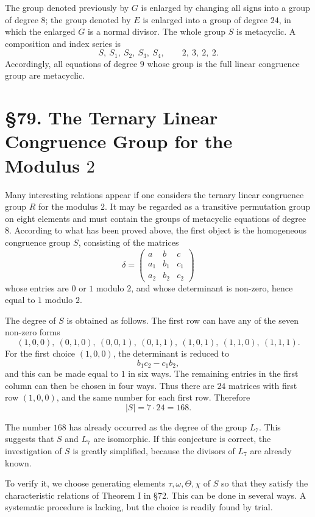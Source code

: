 \documentclass[11pt,a4paper]{book}
\newcommand{\webersection}[2]{\clearpage\section*{\S #1. #2}}
\begin{document}
The group denoted previously by \(G\) is enlarged by changing all signs into a group of degree \(8\); the group denoted by \(E\) is enlarged into a group of degree \(24\), in which the enlarged \(G\) is a normal divisor.  The whole group \(S\) is metacyclic.  A composition and index series is
\[
 S,\ S_1,\ S_2,\ S_3,\ S_4,
 \qquad
 2,\ 3,\ 2,\ 2.
\]
Accordingly, all equations of degree \(9\) whose group is the full linear congruence group are metacyclic.

\webersection{79}{The Ternary Linear Congruence Group for the Modulus \(2\)}

Many interesting relations appear if one considers the ternary linear congruence group \(R\) for the modulus \(2\).  It may be regarded as a transitive permutation group on eight elements and must contain the groups of metacyclic equations of degree \(8\).  According to what has been proved above, the first object is the homogeneous congruence group \(S\), consisting of the matrices
\[
 \delta=
 \begin{pmatrix}
 a&b&c\\
 a_1&b_1&c_1\\
 a_2&b_2&c_2
 \end{pmatrix}
\]
whose entries are \(0\) or \(1\) modulo \(2\), and whose determinant is non-zero, hence equal to \(1\) modulo \(2\).

The degree of \(S\) is obtained as follows.  The first row can have any of the seven non-zero forms
\[
 (1,0,0),\ (0,1,0),\ (0,0,1),\ (0,1,1),\ (1,0,1),\ (1,1,0),\ (1,1,1).
\]
For the first choice \((1,0,0)\), the determinant is reduced to
\[
 b_1c_2-c_1b_2,
\]
and this can be made equal to \(1\) in six ways.  The remaining entries in the first column can then be chosen in four ways.  Thus there are \(24\) matrices with first row \((1,0,0)\), and the same number for each first row.  Therefore
\[
 |S|=7\cdot24=168.
\]

The number \(168\) has already occurred as the degree of the group \(L_7\).  This suggests that \(S\) and \(L_7\) are isomorphic.  If this conjecture is correct, the investigation of \(S\) is greatly simplified, because the divisors of \(L_7\) are already known.

To verify it, we choose generating elements \(\tau,\omega,\Theta,\chi\) of \(S\) so that they satisfy the characteristic relations of Theorem I in \S 72.  This can be done in several ways.  A systematic procedure is lacking, but the choice is readily found by trial.
\end{document}
